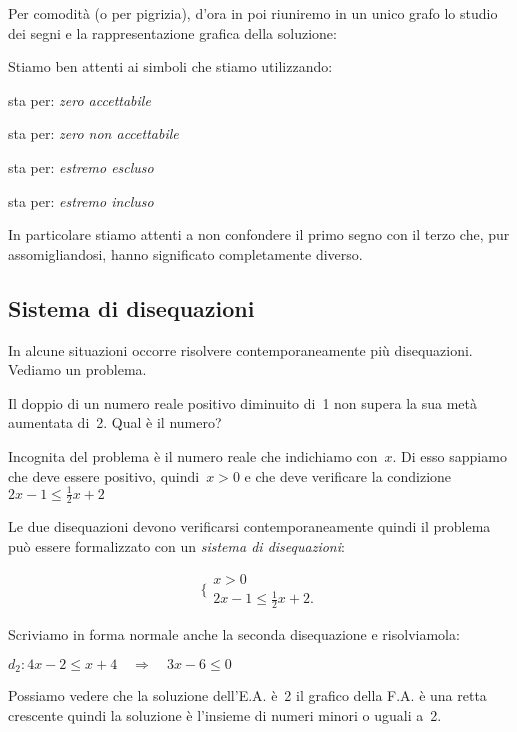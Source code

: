 \osservazione Per comodità (o per pigrizia), d'ora in poi riuniremo in un
unico grafo lo studio dei segni e la rappresentazione grafica della soluzione:



Stiamo ben attenti ai simboli che stiamo utilizzando:
\begin{multicols}{2}

sta per: \emph{zero accettabile}

sta per: \emph{zero non accettabile}

sta per: \emph{estremo escluso}

sta per: \emph{estremo incluso}
\end{multicols}

In particolare stiamo attenti a non confondere il primo segno
con il terzo che, pur assomigliandosi,
hanno significato completamente diverso.

\subsection{Sistema di disequazioni}
\label{sec:dis_sistemi}

In alcune situazioni occorre risolvere contemporaneamente più
disequazioni. Vediamo un problema.

\begin{problema}
Il doppio di un numero reale positivo diminuito di~1 non supera la sua
metà aumentata di~2. Qual è il numero?
\end{problema}

Incognita del problema è il numero reale che indichiamo con~$x$. Di esso
sappiamo che deve essere positivo, quindi~$x>0$ e che deve verificare
la condizione~$2x-1\le \frac{1}{2}x+2$

Le due disequazioni devono verificarsi contemporaneamente quindi
il problema può essere formalizzato con un \emph{sistema di disequazioni}:

\[\bigg \{%
\begin{array}{l}
 x>0\\
 2x-1\le\frac{1}{2}x+2.
\end{array}\]

Scriviamo in forma normale anche la seconda disequazione e risolviamola:

$d_2:4x-2\le x+4 \quad \Rightarrow \quad 3x -6 \le 0$

Possiamo vedere che la soluzione dell'E.A. è~2
il grafico della F.A. è una retta crescente
quindi la soluzione è l'insieme di numeri minori o uguali a~2.

